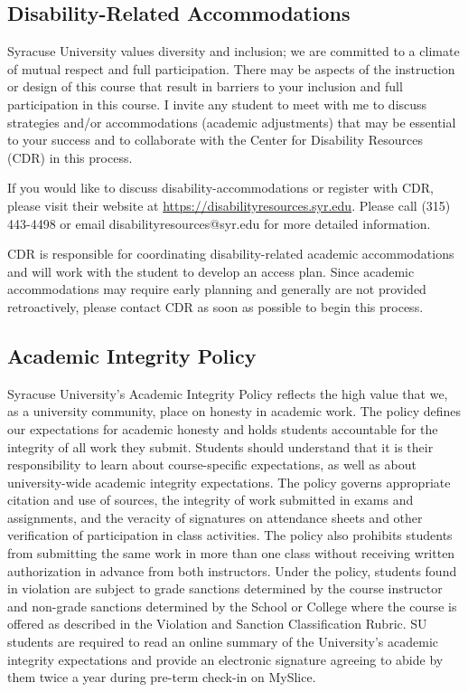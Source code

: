 \documentclass[12pt]{article}
\begin{document}
\subsection*{Disability-Related Accommodations}

Syracuse University values diversity and inclusion; we are committed to a climate of mutual respect and full participation.  There may be aspects of the instruction or design of this course that result in barriers to your inclusion and full participation in this course.  I invite any student to meet with me to discuss strategies and/or accommodations (academic adjustments) that may be essential to your success and to collaborate with the Center for Disability Resources (CDR) in this process.

If you would like to discuss disability-accommodations or register with CDR, please visit their website at \url{https://disabilityresources.syr.edu}. Please call (315) 443-4498 or email disabilityresources@syr.edu for more detailed information.

CDR is responsible for coordinating disability-related academic accommodations and will work with the student to develop an access plan. Since academic accommodations may require early planning and generally are not provided retroactively, please contact CDR as soon as possible to begin this process.

\subsection*{Academic Integrity Policy}

Syracuse University’s Academic Integrity Policy reflects the high value that we, as a university community, place on honesty in academic work. The policy defines our expectations for academic honesty and holds students accountable for the integrity of all work they submit. Students should understand that it is their responsibility to learn about course-specific expectations, as well as about university-wide academic integrity expectations. The policy governs appropriate citation and use of sources, the integrity of work submitted in exams and assignments, and the veracity of signatures on attendance sheets and other verification of participation in class activities. The policy also prohibits students from submitting the same work in more than one class without receiving written authorization in advance from both instructors. Under the policy, students found in violation are subject to grade sanctions determined by the course instructor and non-grade sanctions determined by the School or College where the course is offered as described in the Violation and Sanction Classification Rubric. SU students are required to read an online summary of the University’s academic integrity expectations and provide an electronic signature agreeing to abide by them twice a year during pre-term check-in on MySlice. 
\end{document}
